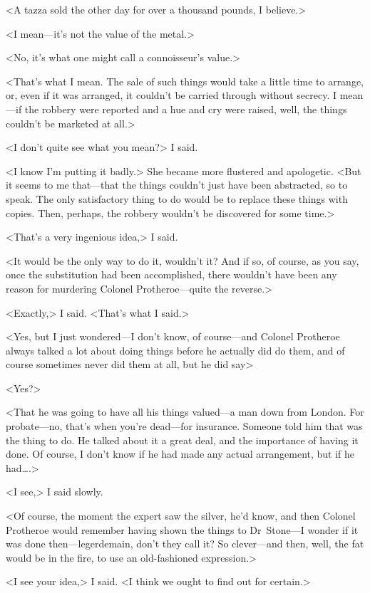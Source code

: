 <A tazza sold the other day for over a thousand pounds, I believe.>

<I mean—it's not the value of the metal.>

<No, it's what one might call a connoisseur's value.>

<That's what I mean. The sale of such things would take a little time to arrange, or, even if it was arranged, it couldn't be carried through without secrecy. I mean—if the robbery were reported and a hue and cry were raised, well, the things couldn't be marketed at all.>

<I don't quite see what you mean?> I said.

<I know I'm putting it badly.> She became more flustered and apologetic. <But it seems to me that—that the things couldn't just have been abstracted, so to speak. The only satisfactory thing to do would be to replace these things with copies. Then, perhaps, the robbery wouldn't be discovered for some time.>

<That's a very ingenious idea,> I said.

<It would be the only way to do it, wouldn't it? And if so, of course, as you say, once the substitution had been accomplished, there wouldn't have been any reason for murdering Colonel Protheroe—quite the reverse.>

<Exactly,> I said. <That's what I said.>

<Yes, but I just wondered—I don't know, of course—and Colonel Protheroe always talked a lot about doing things before he actually did do them, and of course sometimes never did them at all, but he did say\longdash>

<Yes?>

<That he was going to have all his things valued—a man down from London. For probate—no, that's when you're dead—for insurance. Someone told him that was the thing to do. He talked about it a great deal, and the importance of having it done. Of course, I don't know if he had made any actual arrangement, but if he had\dots.>

<I see,> I said slowly.

<Of course, the moment the expert saw the silver, he'd know, and then Colonel Protheroe would remember having shown the things to Dr~Stone—I wonder if it was done then—legerdemain, don't they call it? So clever—and then, well, the fat would be in the fire, to use an old-fashioned expression.>

<I see your idea,> I said. <I think we ought to find out for certain.>

